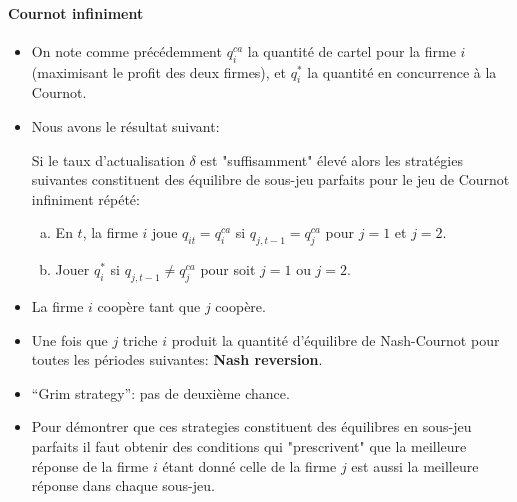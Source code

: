 \documentclass[notes, ignorenonframetext, compress, 9pt, xcolor=svgnames, aspectratio=169]{beamer}
\begin{document}
\begin{frame}
[allowframebreaks]{\insertsection}
\framesubtitle{Cournot infiniment\\}

\begin{itemize}
    \item On note comme précédemment $q^{ca}_i$ la quantité de cartel pour la firme $i$(maximisant le profit des deux firmes), et $q_i^*$ 
    la quantité en concurrence à la Cournot.
    \item Nous avons le résultat suivant:  
    \begin{proposition}
        Si le taux d'actualisation $\delta$ est "suffisamment"  élevé 
         alors les stratégies suivantes constituent des équilibre de sous-jeu parfaits pour  
         le jeu de Cournot infiniment répété:  
         \begin{enumerate}[(a)]
             \item En $t$, la firme $i$ joue  $q_{it} =q^{ca}_i$ si $q_{j,t-1} =q^{ca}_j$ pour $j=1$ et $j=2$. 
             \item Jouer $q^*_i$ si $q_{j,t-1} \neq q^{ca}_j$ pour soit $j=1$ ou $j=2$.
         \end{enumerate}
    \end{proposition}
    \item La firme $i$ coopère tant que $j$ coopère.
    \item Une fois que $j$ triche $i$ produit la quantité d'équilibre de Nash-Cournot 
    pour toutes les périodes suivantes: \textbf{Nash reversion}.
    \item “Grim strategy”: pas de deuxième chance.
    \item Pour démontrer que ces strategies constituent des équilibres en sous-jeu parfaits il   
    faut obtenir des conditions qui "prescrivent" que la meilleure réponse 
    de la firme $i$ étant donné celle de la firme $j$ est aussi la meilleure réponse 
    dans chaque sous-jeu.
\end{itemize}

\end{frame}
\end{document}
